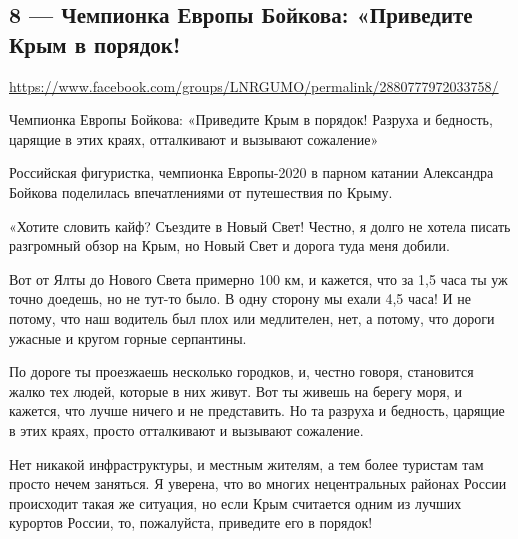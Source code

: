  
 
  
\clearpage
\subsection{8 --- Чемпионка Европы Бойкова: «Приведите Крым в порядок!}
\label{sec:27_07_2020.fb.lnr.8}
\url{https://www.facebook.com/groups/LNRGUMO/permalink/2880777972033758/}

Чемпионка Европы Бойкова: «Приведите Крым в порядок! Разруха и бедность,
царящие в этих краях, отталкивают и вызывают сожаление»

Российская фигуристка, чемпионка Европы-2020 в парном катании Александра
Бойкова поделилась впечатлениями от путешествия по Крыму.

«Хотите словить кайф? Съездите в Новый Свет! Честно, я долго не хотела писать
разгромный обзор на Крым, но Новый Свет и дорога туда меня добили.

Вот от Ялты до Нового Света примерно 100 км, и кажется, что за 1,5 часа ты уж
точно доедешь, но не тут-то было. В одну сторону мы ехали 4,5 часа! И не
потому, что наш водитель был плох или медлителен, нет, а потому, что дороги
ужасные и кругом горные серпантины.

По дороге ты проезжаешь несколько городков, и, честно говоря, становится жалко
тех людей, которые в них живут. Вот ты живешь на берегу моря, и кажется, что
лучше ничего и не представить. Но та разруха и бедность, царящие в этих краях,
просто отталкивают и вызывают сожаление.

Нет никакой инфраструктуры, и местным жителям, а тем более туристам там просто
нечем заняться. Я уверена, что во многих нецентральных районах России
происходит такая же ситуация, но если Крым считается одним из лучших курортов
России, то, пожалуйста, приведите его в порядок!
  
